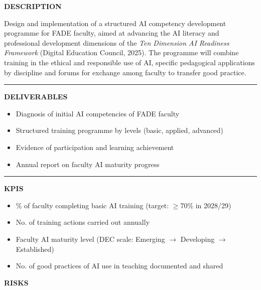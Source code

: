 \documentclass[11pt,a4paper]{scrreprt}
\newcommand{\fieldlabel}[1]{%
  {\footnotesize\sffamily\bfseries\color{mutedcolor}\MakeUppercase{#1}}\par\nopagebreak[4]
}
\newcommand{\fieldsep}{\vspace{3pt}\noindent\textcolor{bordercolor}{\rule{\linewidth}{0.4pt}}\vspace{3pt}\par}
\begin{document}
\begin{tcolorbox}[pabox={aacolor}{A.P.4.3 \enspace\textbullet\enspace Development of AI Literacy for Faculty}]

\fieldlabel{Description}
{\small Design and implementation of a structured AI competency development programme for FADE faculty, aimed at advancing the AI literacy and professional development dimensions of the \textit{Ten Dimension AI Readiness Framework} (Digital Education Council, 2025). The programme will combine training in the ethical and responsible use of AI, specific pedagogical applications by discipline and forums for exchange among faculty to transfer good practice.}\par
\fieldsep
\fieldlabel{Deliverables}
{\small \begin{itemize}[noitemsep,topsep=2pt]
\item Diagnosis of initial AI competencies of FADE faculty
\item Structured training programme by levels (basic, applied, advanced)
\item Evidence of participation and learning achievement
\item Annual report on faculty AI maturity progress
\end{itemize}}\par
\fieldsep
\fieldlabel{KPIs}
{\small \begin{itemize}[noitemsep,topsep=2pt]
\item \% of faculty completing basic AI training (target: $\geq$70\% in 2028/29)
\item No. of training actions carried out annually
\item Faculty AI maturity level (DEC scale: Emerging $\rightarrow$ Developing $\rightarrow$ Established)
\item No. of good practices of AI use in teaching documented and shared
\end{itemize}}\par
\end{tcolorbox}
\begin{tcolorbox}[riskbox]
{\footnotesize\sffamily\bfseries\color{red!50!black} RISKS}\par{}
\end{tcolorbox}
\end{document}
